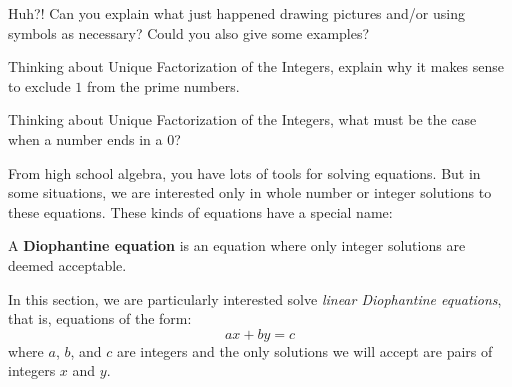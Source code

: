 \begin{question} 
Huh?! Can you explain what just happened drawing pictures and/or using
symbols as necessary? Could you also give some examples?
\end{question}
\QM

\begin{question} 
Thinking about Unique Factorization of the Integers, explain why it
makes sense to exclude $1$ from the prime numbers.
\end{question}
\QM


\begin{question} 
Thinking about Unique Factorization of the Integers, what must be the
case when a number ends in a $0$?
\end{question}
\QM

From high school algebra, you have lots of tools for solving equations.  
But in some situations, we are interested only in whole number or integer solutions 
to these equations.  These kinds of equations have a special name:  

\begin{definition}
A \textbf{Diophantine equation} is an equation where only integer
solutions are deemed acceptable.
\end{definition}

In this section, we are particularly interested solve \textit{linear Diophantine equations}, that is, equations of the form:
\[
ax + by = c
\]
where $a$, $b$, and $c$ are integers and the only solutions we will
accept are pairs of integers $x$ and $y$.  


\newpage

